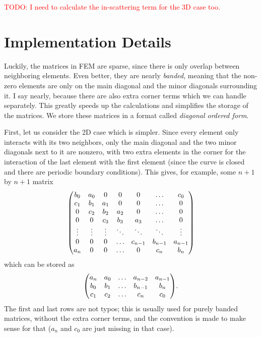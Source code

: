 \documentclass[12pt]{article}
\begin{document}
\textcolor{red}{TODO: I need to calculate the in-scattering term for the 3D case too.}

\section{Implementation Details}
Luckily, the matrices in FEM are sparse, since there is only overlap between neighboring elements.
Even better, they are nearly \emph{banded}, meaning that the non-zero elements are only on the main
diagonal and the minor diagonals surrounding it. I say nearly, because there are also extra corner
terms which we can handle separately. This greatly speeds up the calculations and simplifies the
storage of the matrices. We store these matrices in a format called \emph{diagonal ordered form}.

First, let us consider the 2D case which is simpler. Since every element only interacts with its two
neighbors, only the main diagonal and the two minor diagonals next to it are nonzero, with two extra
elements in the corner for the interaction of the last element with the first element (since the
curve is closed and there are periodic boundary conditions). This gives, for example, some $n+1$ by
$n+1$ matrix
\begin{equation}
    \mqty(b_0 & a_0 & 0 & 0 & 0 & \dots & c_0 \\
          c_1 & b_1 & a_1 & 0 & 0 & \dots & 0 \\
          0 & c_2 & b_2 & a_2 & 0 & \dots & 0 \\
          0 & 0 & c_3 & b_3 & a_3 & \dots & 0 \\
          \vdots & \vdots & \vdots & \ddots & \ddots & \ddots & \vdots \\
          0 & 0 & 0 & \dots & c_{n-1} & b_{n-1} & a_{n-1} \\
          a_n & 0 & 0 & \dots & 0 & c_n & b_n \\)
\end{equation}
which can be stored as
\begin{equation}
    \mqty(a_n & a_0 & \dots & a_{n-2} & a_{n-1} \\
        b_0 & b_1 & \dots & b_{n-1} & b_n \\
        c_1 & c_2 & \dots & c_n & c_0).
\end{equation}
The first and last rows are not typos; this is usually used for purely banded matrices, without the
extra corner terms, and the convention is made to make sense for that ($a_n$ and $c_0$ are just
missing in that case).
\end{document}
